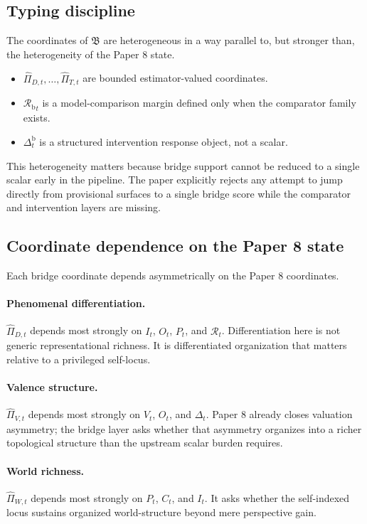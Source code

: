 \documentclass[11pt,a4paper]{article}
\theoremstyle{definition}
\newcommand{\BridgeState}{\mathfrak{B}}
\newcommand{\SelfIndex}{I}
\newcommand{\OwnField}{O}
\newcommand{\ContField}{C}
\newcommand{\Persp}{P}
\newcommand{\ValAsym}{V}
\newcommand{\IntervProf}{\Delta}
\newcommand{\Irred}{\mathcal{R}}
\newcommand{\BridgeMargin}{\mathcal{R}_{\mathrm{b}}}
\begin{document}
\subsection{Typing discipline}
The coordinates of $\BridgeState$ are heterogeneous in a way parallel to, but stronger than, the heterogeneity of the Paper 8 state.
\begin{itemize}[leftmargin=1.5em]
\item $\widehat{\Pi}_{D,t},\ldots,\widehat{\Pi}_{T,t}$ are bounded estimator-valued coordinates.
\item ${\BridgeMargin}_t$ is a model-comparison margin defined only when the comparator family exists.
\item $\IntervProf^{\mathrm{b}}_t$ is a structured intervention response object, not a scalar.
\end{itemize}
This heterogeneity matters because bridge support cannot be reduced to a single scalar early in the pipeline. The paper explicitly rejects any attempt to jump directly from provisional surfaces to a single bridge score while the comparator and intervention layers are missing.

\subsection{Coordinate dependence on the Paper 8 state}
Each bridge coordinate depends asymmetrically on the Paper 8 coordinates.

\paragraph{Phenomenal differentiation.}
$\widehat{\Pi}_{D,t}$ depends most strongly on $\SelfIndex_t$, $\OwnField_t$, $\Persp_t$, and $\Irred_t$. Differentiation here is not generic representational richness. It is differentiated organization that matters relative to a privileged self-locus.

\paragraph{Valence structure.}
$\widehat{\Pi}_{V,t}$ depends most strongly on $\ValAsym_t$, $\OwnField_t$, and $\IntervProf_t$. Paper 8 already closes valuation asymmetry; the bridge layer asks whether that asymmetry organizes into a richer topological structure than the upstream scalar burden requires.

\paragraph{World richness.}
$\widehat{\Pi}_{W,t}$ depends most strongly on $\Persp_t$, $\ContField_t$, and $\SelfIndex_t$. It asks whether the self-indexed locus sustains organized world-structure beyond mere perspective gain.
\end{document}
